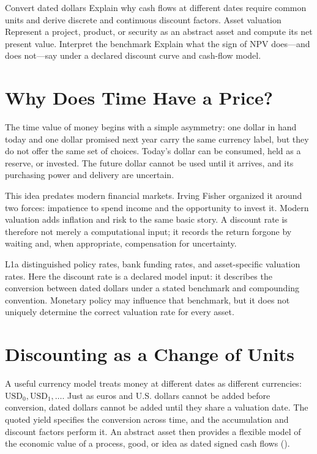 \documentclass[11pt]{article}
\begin{document}

\learningobjectives
  {Convert dated dollars}
  {Explain why cash flows at different dates require common units and derive discrete and continuous discount factors.}
  {Asset valuation}
  {Represent a project, product, or security as an abstract asset and compute its net present value.}
  {Interpret the benchmark}
  {Explain what the sign of NPV does---and does not---say under a declared discount curve and cash-flow model.}

\section{Why Does Time Have a Price?}

The time value of money begins with a simple asymmetry: one dollar in hand today and one dollar promised next year carry the same currency label, but they do not offer the same set of choices. Today's dollar can be consumed, held as a reserve, or invested. The future dollar cannot be used until it arrives, and its purchasing power and delivery are uncertain.

This idea predates modern financial markets. Irving Fisher organized it around two forces: impatience to spend income and the opportunity to invest it. Modern valuation adds inflation and risk to the same basic story. A discount rate is therefore not merely a computational input; it records the return forgone by waiting and, when appropriate, compensation for uncertainty.

L1a distinguished policy rates, bank funding rates, and asset-specific valuation rates. Here the discount rate is a declared model input: it describes the conversion between dated dollars under a stated benchmark and compounding convention. Monetary policy may influence that benchmark, but it does not uniquely determine the correct valuation rate for every asset.

\section{Discounting as a Change of Units}

A useful currency model treats money at different dates as different currencies: $\mathrm{USD}_0,\mathrm{USD}_1,\ldots$. Just as euros and U.S. dollars cannot be added before conversion, dated dollars cannot be added until they share a valuation date. The quoted yield specifies the conversion across time, and the accumulation and discount factors perform it. An abstract asset then provides a flexible model of the economic value of a process, good, or idea as dated signed cash flows ().
\end{document}
